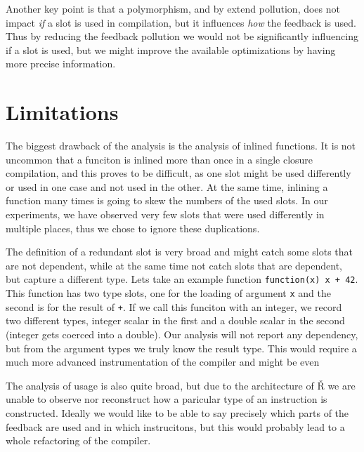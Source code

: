 Another key point is that a polymorphism, and by extend pollution, does not impact \textit{if} a slot is used in compilation, but it influences \textit{how} the feedback is used. Thus by reducing the feedback pollution we would not be significantly influencing if a slot is used, but we might improve the available optimizations by having more precise information.


\section{Limitations}

The biggest drawback of the analysis is the analysis of inlined functions. It is not uncommon that a funciton is inlined more than once in a single closure compilation, and this proves to be difficult, as one slot might be used differently or used in one case and not used in the other. At the same time, inlining a function many times is going to skew the numbers of the used slots. In our experiments, we have observed very few slots that were used differently in multiple places, thus we chose to ignore these duplications.

The definition of a redundant slot is very broad and might catch some slots that are not dependent, while at the same time not catch slots that are dependent, but capture a different type. Lets take an example function \texttt{function(x) x + 42}. This function has two type slots, one for the loading of argument \texttt{x} and the second is for the result of \texttt{+}. If we call this funciton with an integer, we record two different types, integer scalar in the first and a double scalar in the second (integer gets coerced into a double). Our analysis will not report any dependency, but from the argument types we truly know the result type. This would require a much more advanced instrumentation of the compiler and might be even

The analysis of usage is also quite broad, but due to the architecture of Ř we are unable to observe nor reconstruct how a paricular type of an instruction is constructed. Ideally we would like to be able to say precisely which parts of the feedback are used and in which instrucitons, but this would probably lead to a whole refactoring of the compiler.

